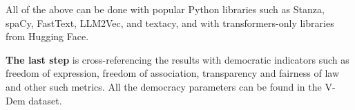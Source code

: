 \documentclass[12pt,a4paper,sans]{moderncv} %
\begin{document}
All of the above can be done with popular Python libraries such as Stanza, spaCy, FastText, LLM2Vec, and textacy, and with transformers-only libraries from Hugging Face. 

\vspace{2mm}

\textbf{The last step} is cross-referencing the results with democratic indicators such as freedom of expression, freedom of association, transparency and fairness of law and other such metrics. All the democracy parameters can be found in the V-Dem dataset.









\end{document}
